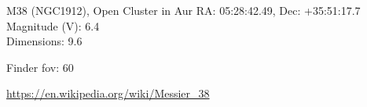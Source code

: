 \begin{block}{M38 (NGC1912), Open Cluster in Aur}
    RA: 05:28:42.49, Dec: +35:51:17.7 \\ 
    Magnitude (V): 6.4 \\ 
    Dimensions: 9.6 

    Finder fov: 60 

    \url{https://en.wikipedia.org/wiki/Messier_38} 
\end{block}